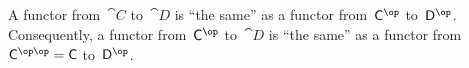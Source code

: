 \subsection{}

A functor from~$\cat{C}$ to~$\cat{D}$ is \enquote{the same} as a functor from~$\cat{C}^{\op}$ to~$\cat{D}^{\op}$.
Consequently, a functor from~$\cat{C}^{\op}$ to~$\cat{D}$ is \enquote{the same} as a functor from~$\cat{C}^{\op\op} = \cat{C}$ to~$\cat{D}^{\op}$.
